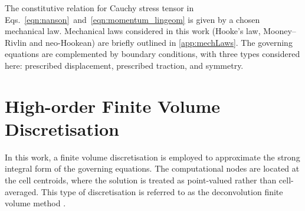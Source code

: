 \documentclass[review,3p]{elsarticle}
\begin{document}
The constitutive relation for Cauchy stress tensor in Eqs.~\eqref{eqn:nanson}~and~\eqref{eqn:momentum_lingeom} is given by a chosen mechanical law.
Mechanical laws considered in this work (Hooke's law, Mooney–Rivlin and neo-Hookean) are briefly outlined in \ref{app:mechLaws}.
The governing equations are complemented by boundary conditions, with three types considered here: prescribed displacement, prescribed traction, and symmetry.
%
%
\section{High-order Finite Volume Discretisation}
\label{sec:HO-FVD}
%
%
In this work, a finite volume discretisation is employed to approximate the strong integral form of the governing equations.
The computational nodes are located at the cell centroids, where the solution is treated as point-valued rather than cell-averaged.
This type of discretisation is referred to as the deconvolution finite volume method \cite{Nishikawa2025, Nishikawa2021}.
%
\end{document}
